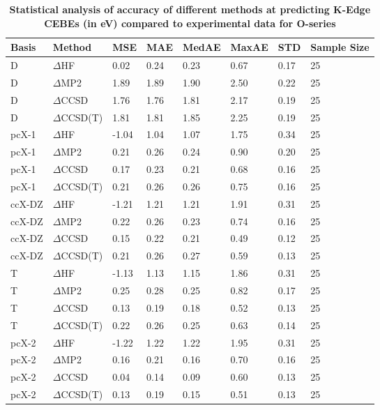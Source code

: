 \begin{table}
  \caption{\textbf{Statistical analysis of accuracy of different methods at predicting K-Edge CEBEs (in eV) compared to experimental data for O-series}}
  \label{tbl:method-summary-o}
  \begin{tabular}{l l l l l l l l }
    \toprule
    \textbf{Basis} & \textbf{Method} & \textbf{MSE} & \textbf{MAE} & \textbf{MedAE} & \textbf{MaxAE} & \textbf{STD} & \textbf{Sample Size} \\ 
    \midrule
    D & $\Delta$HF & 0.02 & 0.24 & 0.23 & 0.67 & 0.17 & 25 \\ 
    D & $\Delta$MP2 & 1.89 & 1.89 & 1.90 & 2.50 & 0.22 & 25 \\ 
    D & $\Delta$CCSD & 1.76 & 1.76 & 1.81 & 2.17 & 0.19 & 25 \\ 
    D & $\Delta$CCSD(T) & 1.81 & 1.81 & 1.85 & 2.25 & 0.19 & 25 \\ 
    pcX-1 & $\Delta$HF & -1.04 & 1.04 & 1.07 & 1.75 & 0.34 & 25 \\ 
    pcX-1 & $\Delta$MP2 & 0.21 & 0.26 & 0.24 & 0.90 & 0.20 & 25 \\ 
    pcX-1 & $\Delta$CCSD & 0.17 & 0.23 & 0.21 & 0.68 & 0.16 & 25 \\ 
    pcX-1 & $\Delta$CCSD(T) & 0.21 & 0.26 & 0.26 & 0.75 & 0.16 & 25 \\ 
    ccX-DZ & $\Delta$HF & -1.21 & 1.21 & 1.21 & 1.91 & 0.31 & 25 \\ 
    ccX-DZ & $\Delta$MP2 & 0.22 & 0.26 & 0.23 & 0.74 & 0.16 & 25 \\ 
    ccX-DZ & $\Delta$CCSD & 0.15 & 0.22 & 0.21 & 0.49 & 0.12 & 25 \\ 
    ccX-DZ & $\Delta$CCSD(T) & 0.21 & 0.26 & 0.27 & 0.59 & 0.13 & 25 \\ 
    T & $\Delta$HF & -1.13 & 1.13 & 1.15 & 1.86 & 0.31 & 25 \\ 
    T & $\Delta$MP2 & 0.25 & 0.28 & 0.25 & 0.82 & 0.17 & 25 \\ 
    T & $\Delta$CCSD & 0.13 & 0.19 & 0.18 & 0.52 & 0.13 & 25 \\ 
    T & $\Delta$CCSD(T) & 0.22 & 0.26 & 0.25 & 0.63 & 0.14 & 25 \\ 
    pcX-2 & $\Delta$HF & -1.22 & 1.22 & 1.22 & 1.95 & 0.31 & 25 \\ 
    pcX-2 & $\Delta$MP2 & 0.16 & 0.21 & 0.16 & 0.70 & 0.16 & 25 \\ 
    pcX-2 & $\Delta$CCSD & 0.04 & 0.14 & 0.09 & 0.60 & 0.13 & 25 \\ 
    pcX-2 & $\Delta$CCSD(T) & 0.13 & 0.19 & 0.15 & 0.51 & 0.13 & 25 \\ 

\end{tabular}
\end{table}
